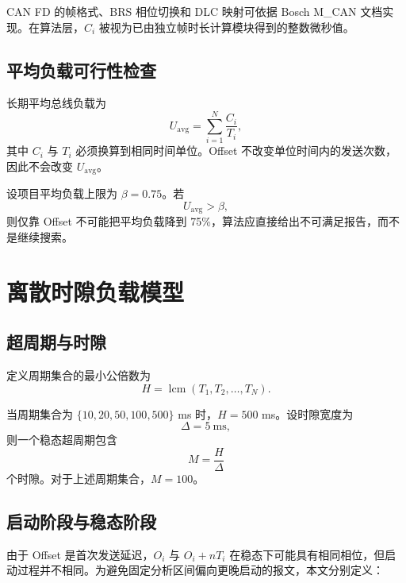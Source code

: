 \documentclass[UTF8,12pt,a4paper]{ctexart}
\DeclareMathOperator{\lcm}{lcm}
\begin{document}
CAN FD 的帧格式、BRS 相位切换和 DLC 映射可依据 Bosch M\_CAN 文档实现\cite{boschmcan}。在算法层，$C_i$ 被视为已由独立帧时长计算模块得到的整数微秒值。

\subsection{平均负载可行性检查}

长期平均总线负载为
\begin{equation}
 U_{\mathrm{avg}}=\sum_{i=1}^{N}\frac{C_i}{T_i},
\label{eq:avg-load}
\end{equation}
其中 $C_i$ 与 $T_i$ 必须换算到相同时间单位。Offset 不改变单位时间内的发送次数，因此不会改变 $U_{\mathrm{avg}}$。

设项目平均负载上限为 $\beta=0.75$。若
\begin{equation}
 U_{\mathrm{avg}}>\beta,
\end{equation}
则仅靠 Offset 不可能把平均负载降到 75\%，算法应直接给出不可满足报告，而不是继续搜索。

\section{离散时隙负载模型}

\subsection{超周期与时隙}

定义周期集合的最小公倍数为
\begin{equation}
 H=\lcm(T_1,T_2,\ldots,T_N).
\label{eq:hyperperiod}
\end{equation}

当周期集合为 $\{10,20,50,100,500\}$ ms 时，$H=500$ ms。设时隙宽度为
\begin{equation}
 \Delta=5\ \mathrm{ms},
\end{equation}
则一个稳态超周期包含
\begin{equation}
 M=\frac{H}{\Delta}
\end{equation}
个时隙。对于上述周期集合，$M=100$。

\subsection{启动阶段与稳态阶段}

由于 Offset 是首次发送延迟，$O_i$ 与 $O_i+nT_i$ 在稳态下可能具有相同相位，但启动过程并不相同。为避免固定分析区间偏向更晚启动的报文，本文分别定义：
\end{document}
